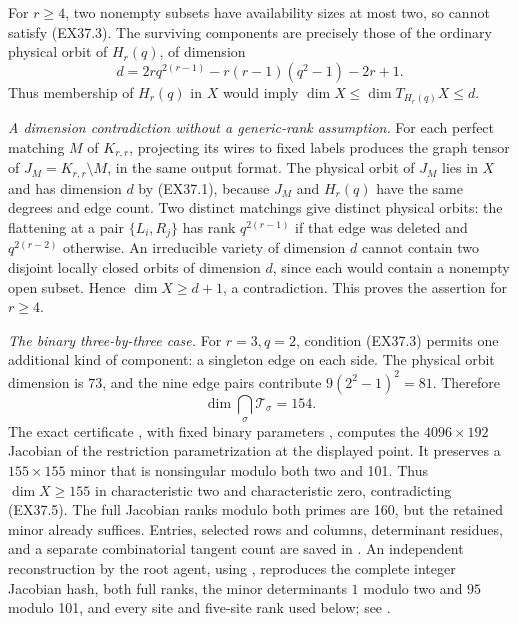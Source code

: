 For $r\ge4$, two nonempty subsets have availability
sizes at most two, so cannot satisfy (EX37.3).
The surviving components are precisely those of the
ordinary physical orbit of $H_r(q)$, of dimension
\[
 d=2r q^{2(r-1)}-r(r-1)(q^2-1)-2r+1.
 \tag{EX37.4}
\]
Thus membership of $H_r(q)$ in $X$ would imply
$\dim X\le\dim T_{H_r(q)}X\le d$.

\emph{A dimension contradiction without a generic-rank assumption.}
For each perfect matching $M$ of $K_{r,r}$, projecting
its wires to fixed labels produces the graph tensor of
$J_M=K_{r,r}\setminus M$, in the same output format.
The physical orbit of $J_M$ lies in $X$ and has dimension
$d$ by (EX37.1), because $J_M$ and $H_r(q)$ have the same
degrees and edge count. Two distinct matchings give
distinct physical orbits: the flattening at a pair
$\{L_i,R_j\}$ has rank $q^{2(r-1)}$ if that edge was
deleted and $q^{2(r-2)}$ otherwise. An irreducible variety
of dimension $d$ cannot contain two disjoint locally
closed orbits of dimension $d$, since each would contain
a nonempty open subset. Hence $\dim X\ge d+1$, a
contradiction. This proves the assertion for $r\ge4$.

\emph{The binary three-by-three case.}
For $r=3,q=2$, condition (EX37.3) permits one additional
kind of component: a singleton edge on each side.
The physical orbit dimension is $73$, and the nine
edge pairs contribute $9(2^2-1)^2=81$. Therefore
\[
 \dim\bigcap_\sigma\mathcal T_\sigma=154.
 \tag{EX37.5}
\]
The exact certificate
, with fixed
binary parameters ,
computes the $4096\times192$ Jacobian of the restriction
parametrization at the displayed point. It preserves a
$155\times155$ minor that is nonsingular modulo both
two and 101. Thus $\dim X\ge155$ in characteristic two
and characteristic zero, contradicting (EX37.5).
The full Jacobian ranks modulo both primes are 160,
but the retained minor already suffices. Entries, selected
rows and columns, determinant residues, and a separate
combinatorial tangent count are saved in
.
An independent reconstruction by the root agent, using
, reproduces
the complete integer Jacobian hash, both full ranks, the
minor determinants $1$ modulo two and $95$ modulo 101,
and every site and five-site rank used below; see
.

